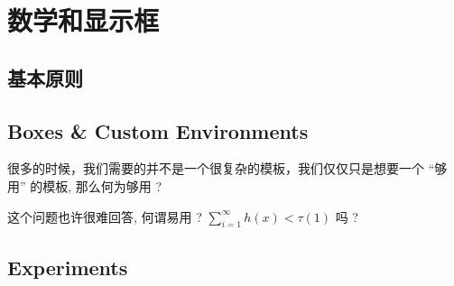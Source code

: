 \documentclass[
  hyper,
  lang = cn,
  class = book,
  layout = margin,
]{ztex}
\begin{document}
\setcounter{chapter}{6}
\mainmatter
\chapter{数学和显示框}
\zhlipsum[1]


\section{基本原则}
\section{Boxes \& Custom Environments}
很多的时候，我们需要的并不是一个很复杂的模板，我们仅仅只是想要一个 ``够用'' 的模板, 那么何为够用 ?

这个问题也许很难回答, 何谓易用 ? $\sum^{\infty}_{i=1} h(x)<\tau(1)$ 吗 ?


\section{Experiments}
\end{document}
